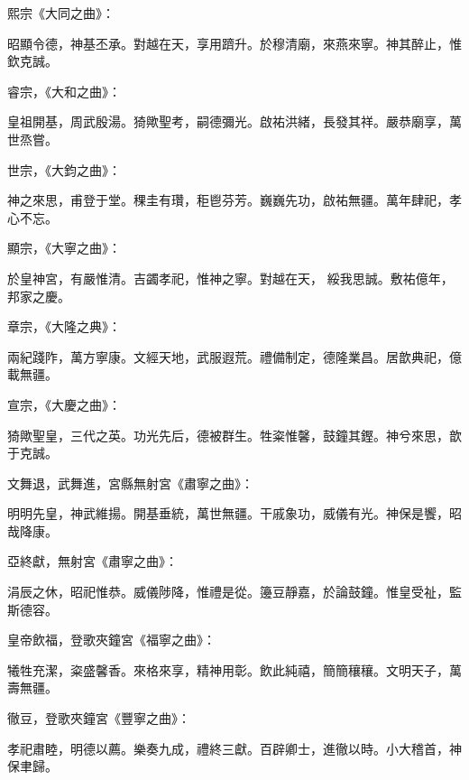 \begin{pinyinscope}
 熙宗《大同之曲》：



 昭顯令德，神基丕承。對越在天，享用躋升。於穆清廟，來燕來寧。神其醉止，惟欽克誠。



 睿宗，《大和之曲》：



 皇祖開基，周武殷湯。猗歟聖考，嗣德彌光。啟祐洪緒，長發其祥。嚴恭廟享，萬世烝嘗。



 世宗，《大鈞之曲》：



 神之來思，甫登于堂。稞圭有瓚，秬鬯芬芳。巍巍先功，啟祐無疆。萬年肆祀，孝心不忘。



 顯宗，《大寧之曲》：



 於皇神宮，有嚴惟清。吉蠲孝祀，惟神之寧。對越在天，
 綏我思誠。敷祐億年，邦家之慶。



 章宗，《大隆之典》：



 兩紀踐阼，萬方寧康。文經天地，武服遐荒。禮備制定，德隆業昌。居歆典祀，億載無疆。



 宣宗，《大慶之曲》：



 猗歟聖皇，三代之英。功光先后，德被群生。牲粢惟馨，鼓鐘其鏗。神兮來思，歆于克誠。



 文舞退，武舞進，宮縣無射宮《肅寧之曲》：



 明明先皇，神武維揚。開基垂統，萬世無疆。干戚象功，威儀有光。神保是饗，昭哉降康。



 亞終獻，無射宮《肅寧之曲》：



 涓辰之休，昭祀惟恭。威儀陟降，惟禮是從。籩豆靜嘉，於論鼓鐘。惟皇受祉，監斯德容。



 皇帝飲福，登歌夾鐘宮《福寧之曲》：



 犧牲充潔，粢盛馨香。來格來享，精神用彰。飲此純禧，簡簡穰穰。文明天子，萬壽無疆。



 徹豆，登歌夾鐘宮《豐寧之曲》：



 孝祀肅睦，明德以薦。樂奏九成，禮終三獻。百辟卿士，進徹以時。小大稽首，神保聿歸。




\end{pinyinscope}

